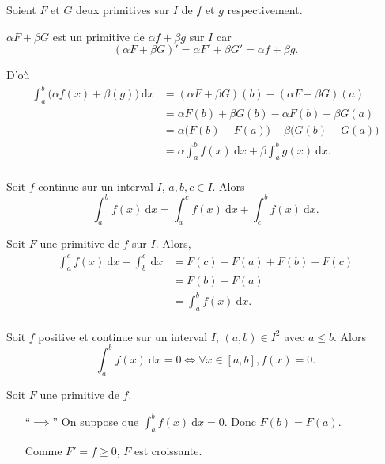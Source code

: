 \begin{prv}
	Soient $F$ et $G$ deux primitives sur $I$ de $f$ et $g$ respectivement.

	$\alpha F + \beta G$ est un primitive de $\alpha f + \beta g$ sur $I$ car
	\[(\alpha F + \beta G)' = \alpha F' + \beta G' = \alpha f + \beta g.\]

	D'où
	\begin{align*}
		\int_{a}^{b} \big(\alpha f(x) + \beta(g)\big) ~\mathrm{d}x &= (\alpha F + \beta G)(b) - (\alpha F + \beta G)(a) \\
		&= \alpha F(b) + \beta G(b) - \alpha F(b) - \beta G(a) \\
		&= \alpha\big(F(b) - F(a)\big) + \beta\big(G(b) - G(a)\big) \\
		&= \alpha \int_{a}^{b} f(x)~\mathrm{d}x + \beta \int_{a}^{b} g(x)~\mathrm{d}x. \\
	\end{align*}
\end{prv}

\begin{prop}[Chasles]
	Soit $f$ continue sur un interval $I$, $a,b,c \in I$. Alors \[
		\int_{a}^{b} f(x)~\mathrm{d}x = \int_{a}^{c} f(x)~\mathrm{d}x + \int_{c}^{b} f(x)~\mathrm{d}x.
	\]
\end{prop}

\begin{prv}
	Soit $F$ une primitive de $f$ sur $I$. Alors,
	\begin{align*}
		\int_{a}^{c} f(x)~\mathrm{d}x + \int_{b}^{c} ~\mathrm{d}x &= F(c) - F(a) + F(b) - F(c) \\
		&= F(b) - F(a) \\
		&= \int_{a}^{b} f(x)~\mathrm{d}x. \\
	\end{align*}
\end{prv}

\begin{prop}
	Soit $f$ positive et continue sur un interval $I$, $(a,b) \in I^2$ avec $a \le b$. Alors \[
		\int_{a}^{b} f(x)~\mathrm{d}x = 0 \iff\forall x \in [a,b], f(x) = 0.
	\]
\end{prop}

\begin{prv} Soit $F$ une primitive de $f$.
	\begin{itemize}
		\item[``$\implies$''] On suppose que $\int_{a}^{b} f(x)~\mathrm{d}x = 0$. Donc $F(b) = F(a)$.

			Comme $F' = f \ge 0$, $F$ est croissante.
	\end{itemize}
\end{prv}


